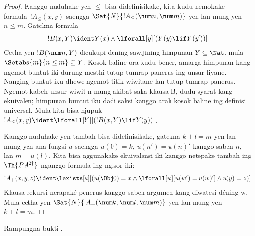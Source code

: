 \documentclass[../../../include/open-logic-section]{subfiles}
\begin{document}
\begin{proof}
Kanggo nuduhake yen $\le$ bisa didefinisikake, kita kudu
nemokake formula~$!A_\le(x, y)$ saengga
$\Sat{N}{!A_\le(\num n, \num m)}$ yen lan mung yen
$n \le m$. Gatekna formula
\[
!B(x, Y) \ident Y(x) \land \lforall[y][(Y(y) \lif Y(y'))]
\]
Cetha yen $!B(\num n, Y)$ dicukupi dening sawijining
himpunan $Y \subseteq \Nat$, mula
$\Setabs{m}{n \le m} \subseteq Y$. Kosok baline ora kudu
bener, amarga himpunan kang ngemot buntut iki durung mesthi
tutup tumrap panerus ing unsur liyane. Nanging buntut iku
dhewe ngemot titik wiwitane lan tutup tumrap panerus. Ngemot kabeh unsur wiwit n mung akibat saka klausa B, dudu syarat kang ekuivalen; himpunan buntut iku dadi saksi kanggo arah kosok baline ing definisi universal. Mula
kita bisa njupuk $!A_\le(x, y) \ident
\lforall[Y][(!B(x, Y) \lif Y(y))]$.

Kanggo nuduhake yen tambah bisa didefinisikake, gatekna
$k+l=m$ yen lan mung yen ana fungsi $u$ saengga
$u(0)=k$, $u(n')=u(n)'$ kanggo saben $n$, lan
$m = u(l)$. Kita bisa nggunakake ekuivalensi iki kanggo
netepake tambah ing $\Th{PA^{2\dagger}}$ nganggo formula
ing ngisor iki:
\[
!A_+(x,y,z) \ident \lexists[u][(u(\Obj 0)=x \land \lforall[w][u(w')=u
 (w)'] \land u(y)=z)]
\] 
Klausa rekursi nerapaké penerus kanggo saben argumen kang diwatesi déning w. Mula cetha yen $\Sat{N}{!A_+(\num k, \num l, \num m)}$
yen lan mung yen $k+l=m$.
\end{proof}

\begin{prob}
Rampungna bukti .
\end{prob}
\end{document}
